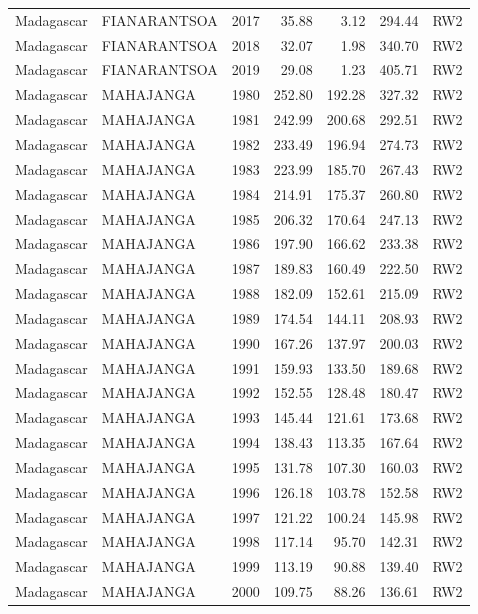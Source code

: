\begin{longtable}{lllrrrl}
  Madagascar & FIANARANTSOA & 2017 & 35.88 & 3.12 & 294.44 & RW2 \\ 
  Madagascar & FIANARANTSOA & 2018 & 32.07 & 1.98 & 340.70 & RW2 \\ 
  Madagascar & FIANARANTSOA & 2019 & 29.08 & 1.23 & 405.71 & RW2 \\ 
  Madagascar & MAHAJANGA & 1980 & 252.80 & 192.28 & 327.32 & RW2 \\ 
  Madagascar & MAHAJANGA & 1981 & 242.99 & 200.68 & 292.51 & RW2 \\ 
  Madagascar & MAHAJANGA & 1982 & 233.49 & 196.94 & 274.73 & RW2 \\ 
  Madagascar & MAHAJANGA & 1983 & 223.99 & 185.70 & 267.43 & RW2 \\ 
  Madagascar & MAHAJANGA & 1984 & 214.91 & 175.37 & 260.80 & RW2 \\ 
  Madagascar & MAHAJANGA & 1985 & 206.32 & 170.64 & 247.13 & RW2 \\ 
  Madagascar & MAHAJANGA & 1986 & 197.90 & 166.62 & 233.38 & RW2 \\ 
  Madagascar & MAHAJANGA & 1987 & 189.83 & 160.49 & 222.50 & RW2 \\ 
  Madagascar & MAHAJANGA & 1988 & 182.09 & 152.61 & 215.09 & RW2 \\ 
  Madagascar & MAHAJANGA & 1989 & 174.54 & 144.11 & 208.93 & RW2 \\ 
  Madagascar & MAHAJANGA & 1990 & 167.26 & 137.97 & 200.03 & RW2 \\ 
  Madagascar & MAHAJANGA & 1991 & 159.93 & 133.50 & 189.68 & RW2 \\ 
  Madagascar & MAHAJANGA & 1992 & 152.55 & 128.48 & 180.47 & RW2 \\ 
  Madagascar & MAHAJANGA & 1993 & 145.44 & 121.61 & 173.68 & RW2 \\ 
  Madagascar & MAHAJANGA & 1994 & 138.43 & 113.35 & 167.64 & RW2 \\ 
  Madagascar & MAHAJANGA & 1995 & 131.78 & 107.30 & 160.03 & RW2 \\ 
  Madagascar & MAHAJANGA & 1996 & 126.18 & 103.78 & 152.58 & RW2 \\ 
  Madagascar & MAHAJANGA & 1997 & 121.22 & 100.24 & 145.98 & RW2 \\ 
  Madagascar & MAHAJANGA & 1998 & 117.14 & 95.70 & 142.31 & RW2 \\ 
  Madagascar & MAHAJANGA & 1999 & 113.19 & 90.88 & 139.40 & RW2 \\ 
  Madagascar & MAHAJANGA & 2000 & 109.75 & 88.26 & 136.61 & RW2 \\ 

\end{longtable}
